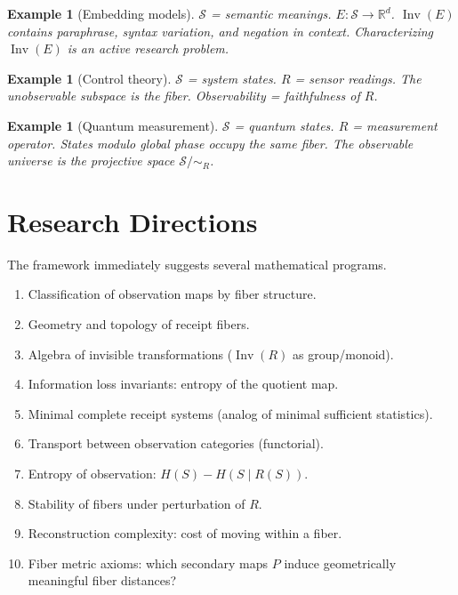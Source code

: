 \documentclass[11pt]{amsart}
\newtheorem{example}[definition]{Example}
\begin{document}
\begin{example}[Embedding models]
$\mathcal{S}$ = semantic meanings. $E: \mathcal{S} \to \mathbb{R}^d$.
$\operatorname{Inv}(E)$ contains paraphrase, syntax variation, and negation
in context. Characterizing $\operatorname{Inv}(E)$ is an active research problem.
\end{example}

\begin{example}[Control theory]
$\mathcal{S}$ = system states. $R$ = sensor readings. The unobservable
subspace is the fiber. Observability = faithfulness of $R$.
\end{example}

\begin{example}[Quantum measurement]
$\mathcal{S}$ = quantum states. $R$ = measurement operator.
States modulo global phase occupy the same fiber.
The observable universe is the projective space $\mathcal{S} / {\sim_R}$.
\end{example}

\section{Research Directions}

The framework immediately suggests several mathematical programs.

\begin{enumerate}[label=\arabic*.]
\item Classification of observation maps by fiber structure.
\item Geometry and topology of receipt fibers.
\item Algebra of invisible transformations ($\operatorname{Inv}(R)$ as group/monoid).
\item Information loss invariants: entropy of the quotient map.
\item Minimal complete receipt systems (analog of minimal sufficient statistics).
\item Transport between observation categories (functorial).
\item Entropy of observation: $H(S) - H(S \mid R(S))$.
\item Stability of fibers under perturbation of $R$.
\item Reconstruction complexity: cost of moving within a fiber.
\item Fiber metric axioms: which secondary maps $P$ induce geometrically meaningful fiber distances?
\end{enumerate}
\end{document}

